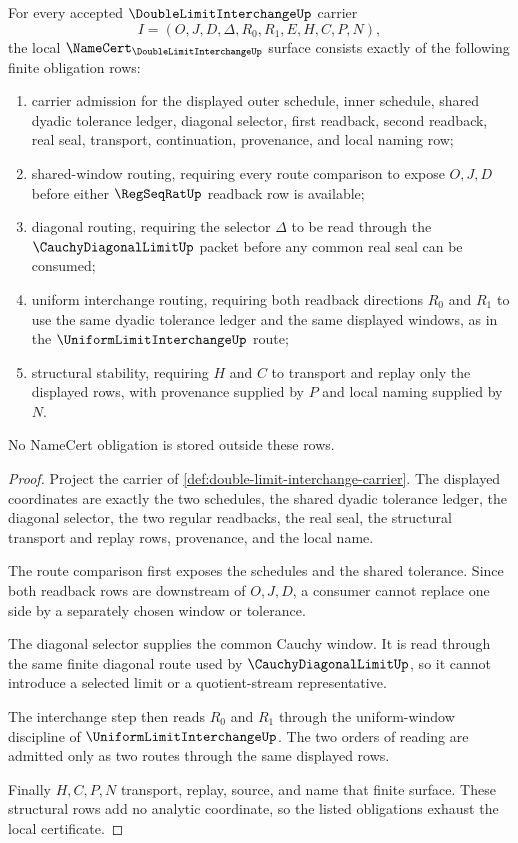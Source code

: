 \begin{theorem}
\label{thm:double-limit-interchange-namecert-obligations}
For every accepted $\DoubleLimitInterchangeUp$ carrier
$$
I=(O,J,D,\Delta,R_0,R_1,E,H,C,P,N),
$$
the local $\NameCert_{\DoubleLimitInterchangeUp}$ surface consists exactly of the following finite obligation rows:
\begin{enumerate}
\item carrier admission for the displayed outer schedule, inner schedule, shared dyadic tolerance ledger, diagonal selector, first readback, second readback, real seal, transport, continuation, provenance, and local naming row;
\item shared-window routing, requiring every route comparison to expose $O,J,D$ before either $\RegSeqRatUp$ readback row is available;
\item diagonal routing, requiring the selector $\Delta$ to be read through the $\CauchyDiagonalLimitUp$ packet before any common real seal can be consumed;
\item uniform interchange routing, requiring both readback directions $R_0$ and $R_1$ to use the same dyadic tolerance ledger and the same displayed windows, as in the $\UniformLimitInterchangeUp$ route;
\item structural stability, requiring $H$ and $C$ to transport and replay only the displayed rows, with provenance supplied by $P$ and local naming supplied by $N$.
\end{enumerate}
No NameCert obligation is stored outside these rows.
\end{theorem}
\begin{proof}
Project the carrier of \autoref{def:double-limit-interchange-carrier}. The displayed coordinates are exactly the two schedules, the shared dyadic tolerance ledger, the diagonal selector, the two regular readbacks, the real seal, the structural transport and replay rows, provenance, and the local name.

The route comparison first exposes the schedules and the shared tolerance. Since both readback rows are downstream of $O,J,D$, a consumer cannot replace one side by a separately chosen window or tolerance.

The diagonal selector supplies the common Cauchy window. It is read through the same finite diagonal route used by $\CauchyDiagonalLimitUp$, so it cannot introduce a selected limit or a quotient-stream representative.

The interchange step then reads $R_0$ and $R_1$ through the uniform-window discipline of $\UniformLimitInterchangeUp$. The two orders of reading are admitted only as two routes through the same displayed rows.

Finally $H,C,P,N$ transport, replay, source, and name that finite surface. These structural rows add no analytic coordinate, so the listed obligations exhaust the local certificate.
\end{proof}


